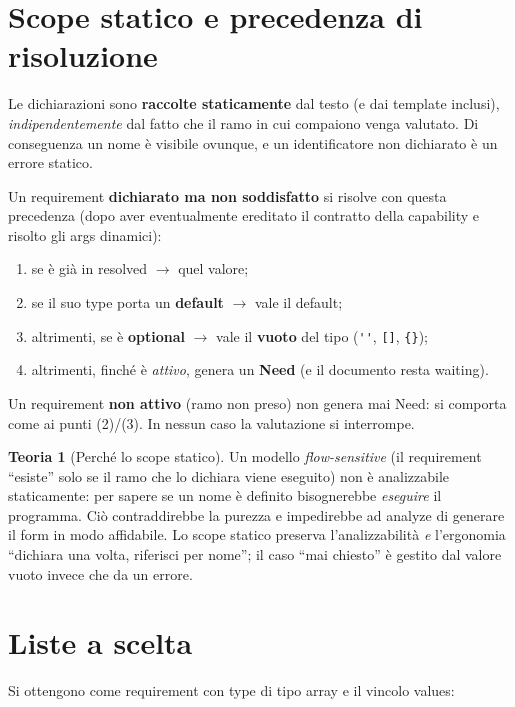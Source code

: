 \documentclass[11pt,a4paper]{book}
\let\code\lstinline
\newcommand{\ic}[1]{{\ttfamily #1}}
\theoremstyle{definition}
\newtheorem*{teoria}{Teoria}
\begin{document}
{{{{\section{Scope statico e precedenza di risoluzione}

Le dichiarazioni sono \textbf{raccolte staticamente} dal testo (e dai template
inclusi), \emph{indipendentemente} dal fatto che il ramo in cui compaiono venga
valutato. Di conseguenza un nome è visibile ovunque, e un identificatore non
dichiarato è un errore statico.

Un requirement \textbf{dichiarato ma non soddisfatto} si risolve con questa
precedenza (dopo aver eventualmente ereditato il contratto della capability e
risolto gli \ic{args} dinamici):

\begin{enumerate}
  \item se è già in \ic{resolved} $\rightarrow$ quel valore;
  \item se il suo \ic{type} porta un \textbf{default} $\rightarrow$ vale il default;
  \item altrimenti, se è \textbf{optional} $\rightarrow$ vale il \textbf{vuoto} del
    tipo (\code|''|, \code|[]|, \verb|{}|);
  \item altrimenti, finché è \emph{attivo}, genera un \textbf{Need} (e il documento
    resta \ic{waiting}).
\end{enumerate}

Un requirement \textbf{non attivo} (ramo non preso) non genera mai \ic{Need}: si
comporta come ai punti (2)/(3). In nessun caso la valutazione si interrompe.

\begin{teoria}[Perché lo scope statico]
Un modello \emph{flow-sensitive} (il requirement ``esiste'' solo se il ramo che lo
dichiara viene eseguito) non è analizzabile staticamente: per sapere se un nome è
definito bisognerebbe \emph{eseguire} il programma. Ciò contraddirebbe la purezza e
impedirebbe ad \ic{analyze} di generare il form in modo affidabile. Lo scope
statico preserva l'analizzabilità \emph{e} l'ergonomia ``dichiara una volta,
riferisci per nome''; il caso ``mai chiesto'' è gestito dal valore vuoto invece che
da un errore.
\end{teoria}

\section{Liste a scelta}

Si ottengono come requirement con \ic{type} di tipo \ic{array} e il vincolo
\ic{values}:

}}}}
\end{document}
